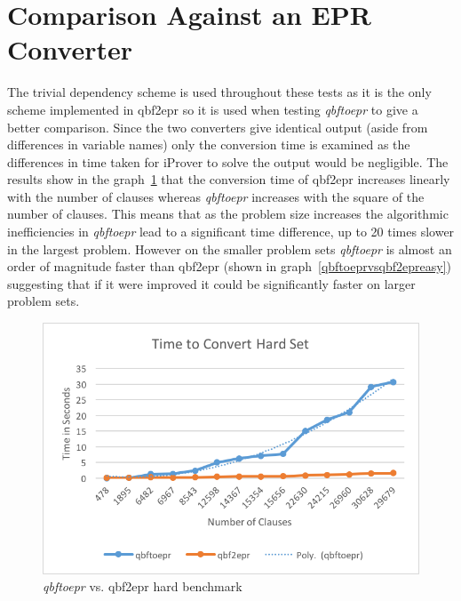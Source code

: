 \section{Comparison Against an EPR Converter}
The trivial dependency scheme is used throughout these tests as it is the only scheme implemented in qbf2epr so it is used when testing \textit{qbftoepr} to give a better comparison. Since the two converters give identical output (aside from differences in variable names) only the conversion time is examined as the differences in time taken for iProver to solve the output would be negligible. The results show in the graph~\ref{qbftoeprvsqbf2eprhard} that the conversion time of qbf2epr increases linearly with the number of clauses whereas \textit{qbftoepr} increases with the square of the number of clauses. This means that as the problem size increases the algorithmic inefficiencies in \textit{qbftoepr} lead to a significant time difference, up to 20 times slower in the largest problem. However on the smaller problem sets \textit{qbftoepr} is almost an order of magnitude faster than qbf2epr (shown in graph~\ref{qbftoeprvsqbf2epreasy}) suggesting that if it were improved it could be significantly faster on larger problem sets.

\begin{figure}[h]
\caption{\textit{qbftoepr} vs. qbf2epr hard benchmark}
\label{qbftoeprvsqbf2eprhard}
\begin{CenteredBox}
\includegraphics{png/qbftoeprvsqbf2eprhard.png}
\end{CenteredBox}
\end{figure}

